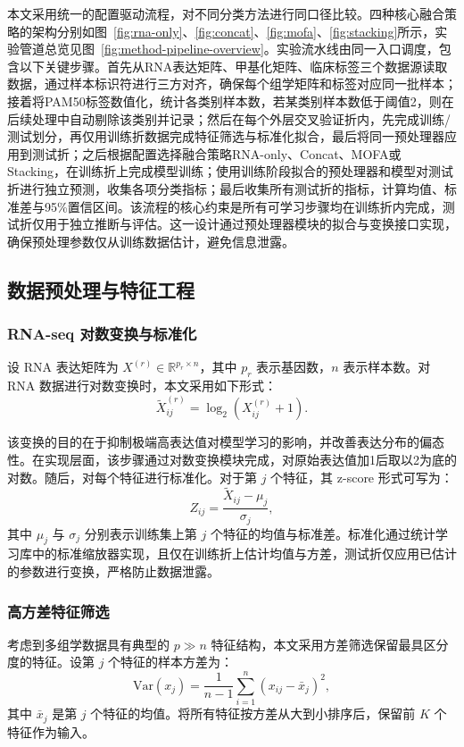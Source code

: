 本文采用统一的配置驱动流程，对不同分类方法进行同口径比较。四种核心融合策略的架构分别如图~\ref{fig:rna-only}、\ref{fig:concat}、\ref{fig:mofa}、\ref{fig:stacking}所示，实验管道总览见图~\ref{fig:method-pipeline-overview}。实验流水线由同一入口调度，包含以下关键步骤。首先从RNA表达矩阵、甲基化矩阵、临床标签三个数据源读取数据，通过样本标识符进行三方对齐，确保每个组学矩阵和标签对应同一批样本；接着将PAM50标签数值化，统计各类别样本数，若某类别样本数低于阈值2，则在后续处理中自动剔除该类别并记录；然后在每个外层交叉验证折内，先完成训练/测试划分，再仅用训练折数据完成特征筛选与标准化拟合，最后将同一预处理器应用到测试折；之后根据配置选择融合策略RNA-only、Concat、MOFA或Stacking，在训练折上完成模型训练；使用训练阶段拟合的预处理器和模型对测试折进行独立预测，收集各项分类指标；最后收集所有测试折的指标，计算均值、标准差与95\%置信区间。该流程的核心约束是所有可学习步骤均在训练折内完成，测试折仅用于独立推断与评估。这一设计通过预处理器模块的拟合与变换接口实现，确保预处理参数仅从训练数据估计，避免信息泄露。

\subsection{数据预处理与特征工程}

\subsubsection{RNA-seq 对数变换与标准化}

设 RNA 表达矩阵为 $X^{(r)} \in \mathbb{R}^{p_r \times n}$，其中 $p_r$ 表示基因数，$n$ 表示样本数。对 RNA 数据进行对数变换时，本文采用如下形式：
\[
\tilde{X}^{(r)}_{ij} = \log_2\left(X^{(r)}_{ij} + 1\right).
\]

该变换的目的在于抑制极端高表达值对模型学习的影响，并改善表达分布的偏态性。在实现层面，该步骤通过对数变换模块完成，对原始表达值加1后取以2为底的对数。随后，对每个特征进行标准化。对于第 $j$ 个特征，其 z-score 形式可写为：
\[
Z_{ij} = \frac{\tilde{X}_{ij} - \mu_j}{\sigma_j},
\]
其中 $\mu_j$ 与 $\sigma_j$ 分别表示训练集上第 $j$ 个特征的均值与标准差。标准化通过统计学习库中的标准缩放器实现，且仅在训练折上估计均值与方差，测试折仅应用已估计的参数进行变换，严格防止数据泄露。

\subsubsection{高方差特征筛选}

考虑到多组学数据具有典型的 $p \gg n$ 特征结构，本文采用方差筛选保留最具区分度的特征。设第 $j$ 个特征的样本方差为：
\[
\mathrm{Var}(x_j) = \frac{1}{n-1} \sum_{i=1}^{n} (x_{ij} - \bar{x}_j)^2,
\]
其中 $\bar{x}_j$ 是第 $j$ 个特征的均值。将所有特征按方差从大到小排序后，保留前 $K$ 个特征作为输入。

